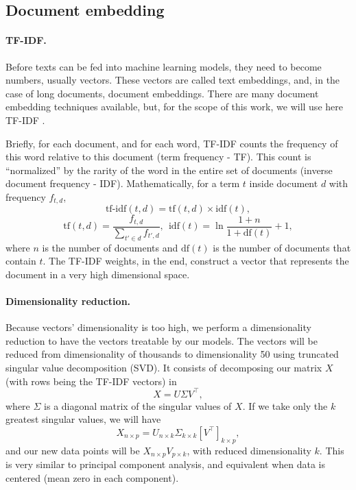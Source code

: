 \subsection{Document embedding}
    \label{sec:document_embedding}

    \paragraph{TF-IDF.} Before texts can be fed into machine learning models, they need to become numbers, usually vectors. These vectors are called text embeddings, and, in the case of long documents, document embeddings. There are many document embedding techniques available, but, for the scope of this work, we will use here TF-IDF \cite{robertson2004understanding}.

    Briefly, for each document, and for each word, TF-IDF counts the frequency of this word relative to this document (term frequency - TF). This count is ``normalized'' by the rarity of the word in the entire set of documents (inverse document frequency - IDF). Mathematically, for a term $t$ inside document $d$ with frequency $f_{t, d}$,
    \[\text{tf-idf}(t, d) = \text{tf}(t, d) \times \text{idf}(t),\]
    \[\text{tf}(t, d) = \frac{f_{t, d}}{\sum_{t' \in d} f_{t', d}}, \ \ \text{idf}(t) = \ln \frac{1+n}{1+\text{df}(t)}+1,\]                  
    where $n$ is the number of documents and $\text{df}(t)$ is the number of documents that contain $t$. The TF-IDF weights, in the end, construct a vector that represents the document in a very high dimensional space.

    \paragraph{Dimensionality reduction.} Because vectors' dimensionality is too high, we perform a dimensionality reduction to have the vectors treatable by our models. The vectors will be reduced from dimensionality of thousands to dimensionality 50 using truncated singular value decomposition (SVD). It consists of decomposing our matrix $X$ (with rows being the TF-IDF vectors) in
    \[X = U \Sigma V^\intercal,\]                  
    where $\Sigma$ is a diagonal matrix of the singular values of $X$. If we take only the $k$ greatest singular values, we will have
    \[X_{n \times p} = U_{n \times k} \Sigma_{k \times k} \left[V^\intercal\right]_{k \times p},\]                  
    and our new data points will be $X_{n \times p} V_{p \times k}$, with reduced dimensionality $k$. This is very similar to principal component analysis, and equivalent when data is centered (mean zero in each component).

